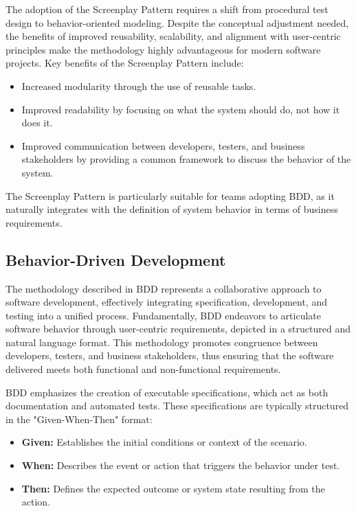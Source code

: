 The adoption of the Screenplay Pattern requires a shift from procedural test design to behavior-oriented modeling. Despite the conceptual adjustment needed, the benefits of improved reusability, scalability, and alignment with user-centric principles make the methodology highly advantageous for modern software projects.
Key benefits of the Screenplay Pattern include:
\begin{itemize}
    \item Increased modularity through the use of reusable tasks.
    \item Improved readability by focusing on what the system should do, not how it does it.
    \item Improved communication between developers, testers, and business stakeholders by providing a common framework to discuss the behavior of the system.
\end{itemize}

The Screenplay Pattern is particularly suitable for teams adopting \ac{BDD}, as it naturally integrates with the definition of system behavior in terms of business requirements.

\subsection{Behavior-Driven Development}\label{sub:BDD}

The methodology described in \ac{BDD} represents a collaborative approach to software development, effectively integrating specification, development, and testing into a unified process. Fundamentally, \ac{BDD} endeavors to articulate software behavior through user-centric requirements, depicted in a structured and natural language format. This methodology promotes congruence between developers, testers, and business stakeholders, thus ensuring that the software delivered meets both functional and non-functional requirements.

\ac{BDD} emphasizes the creation of executable specifications, which act as both documentation and automated tests. These specifications are typically structured in the "Given-When-Then" format:
\begin{itemize}
    \item \textbf{Given:} Establishes the initial conditions or context of the scenario. 
    \item \textbf{When:} Describes the event or action that triggers the behavior under test.
    \item \textbf{Then:} Defines the expected outcome or system state resulting from the action.
\end{itemize}

